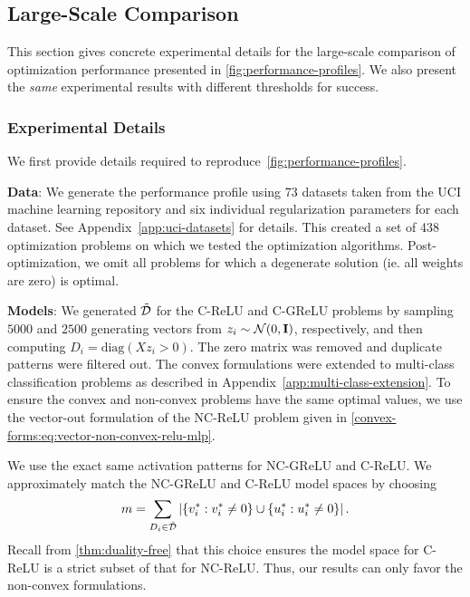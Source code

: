 
\subsection{Large-Scale Comparison}\label{app:performance-profiles}

This section gives concrete experimental details for the large-scale comparison of optimization performance presented in \cref{fig:performance-profiles}.
We also present the \emph{same} experimental results with different thresholds for success.

\subsubsection{Experimental Details}

We first provide details required to reproduce~\cref{fig:performance-profiles}.

\textbf{Data}: We generate the performance profile using 73 datasets taken from the UCI machine learning repository and six individual regularization parameters for each dataset.
See Appendix~\ref{app:uci-datasets} for details.
This created a set of 438 optimization problems on which we tested the optimization algorithms.
Post-optimization, we omit all problems for which a degenerate solution (ie. all weights are zero) is optimal.

\textbf{Models}: We generated \( \tilde {\mathcal{D}} \) for the C-ReLU and C-GReLU problems by sampling \( 5000 \) and \( 2500 \) generating vectors from \( z_i \sim \mathcal{N}(0, \mathbf{I}) \), respectively, and then computing \( D_i = \text{diag}(X z_i > 0) \).
The zero matrix was removed and duplicate patterns were filtered out.
The convex formulations were extended to multi-class classification problems as described in Appendix~\ref{app:multi-class-extension}.
To ensure the convex and non-convex problems have the same optimal values, we use the vector-out formulation of the NC-ReLU problem given in \cref{convex-forms:eq:vector-non-convex-relu-mlp}.

We use the exact same activation patterns for NC-GReLU and C-ReLU.
We approximately match the NC-GReLU and C-ReLU model spaces by choosing
\[ m = \sum_{D_i \in \tilde {\mathcal{D}}} \left\vert \left\{v^*_i : v^*_i \neq 0\right\} \cup \left\{u^*_i : u^*_i \neq 0\right\} \right\vert. \]
Recall from \cref{thm:duality-free} that this choice ensures the model space for C-ReLU is a strict subset of that for NC-ReLU.
Thus, our results can only favor the non-convex formulations.

